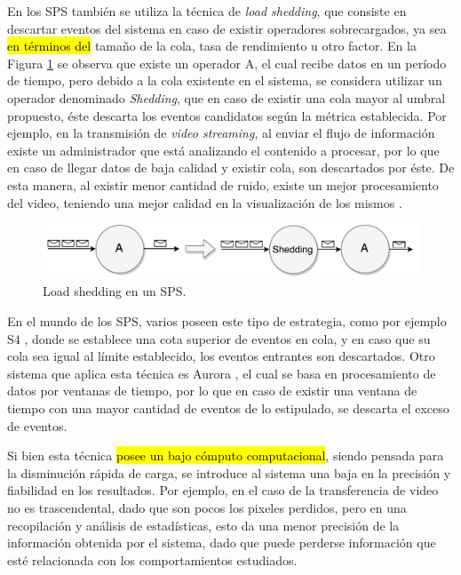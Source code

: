 En los SPS también se utiliza la técnica de \textit{load shedding}, que consiste en descartar eventos del sistema en caso de existir operadores sobrecargados, ya sea \hl{en términos del} tamaño de la cola, tasa de rendimiento u otro factor. En la Figura \ref{fig:loadShedding} se observa que existe un operador A, el cual recibe datos en un período de tiempo, pero debido a la cola existente en el sistema, se considera utilizar un operador denominado \textit{Shedding}, que en caso de existir una cola mayor al umbral propuesto, éste descarta los eventos candidatos según la métrica establecida. Por ejemplo, en la transmisión de \textit{video streaming}, al enviar el flujo de información existe un administrador que está analizando el contenido a procesar, por lo que en caso de llegar datos de baja calidad y existir cola, son descartados por éste. De esta manera, al existir menor cantidad de ruido, existe un mejor procesamiento del video, teniendo una mejor calidad en la visualización de los mismos \citep{SheuC09}. 

\begin{figure}[!ht]
	\centering
	\includegraphics[scale=0.6]{images/LoadShedding.pdf}
	\caption{Load shedding en un SPS.}
	\label{fig:loadShedding}
\end{figure}

En el mundo de los SPS, varios poseen este tipo de estrategia, como por ejemplo S4 \citep{s4}, donde se establece una cota superior de eventos en cola, y en caso que su cola sea igual al límite establecido, los eventos entrantes son descartados. Otro sistema que aplica esta técnica es Aurora \citep{aurora}, el cual se basa en procesamiento de datos por ventanas de tiempo, por lo que en caso de existir una ventana de tiempo con una mayor cantidad de eventos de lo estipulado, se descarta el exceso de eventos.

Si bien esta técnica \hl{posee un bajo cómputo computacional}, siendo pensada para la disminución rápida de carga, se introduce al sistema una baja en la precisión y fiabilidad en los resultados. Por ejemplo, en el caso de la transferencia de video no es trascendental, dado que son pocos los pixeles perdidos, pero en una recopilación y análisis de estadísticas, esto da una menor precisión de la información obtenida por el sistema, dado que puede perderse información que esté relacionada con los comportamientos estudiados.

